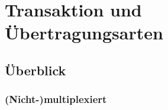 \section{Transaktion und Übertragungsarten}
\subsection{Überblick}
\subsubsection*{(Nicht-)multiplexiert}


